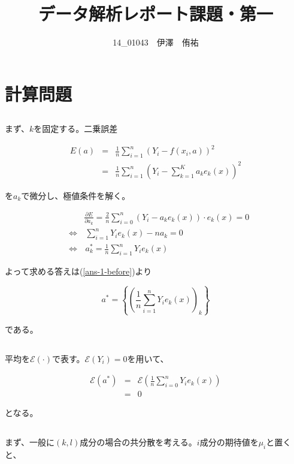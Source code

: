 \documentclass[a4paper,xelatex,ja=standard,jafont=hiragino-pron]{bxjsarticle}
\title{データ解析レポート課題・第一}
\author{14\_01043　伊澤　侑祐}
\date{}
\begin{document}
\maketitle
\section{計算問題}
\subsection{}
まず、$k$を固定する。二乗誤差

\begin{eqnarray}
  E(a) &=& \frac{1}{n} \sum_{i = 1}^n (Y_i - f(x_i, a))^2 \nonumber \\
       &=& \frac{1}{n} \sum_{i = 1}^n (Y_i - \sum_{k = 1}^K a_k e_k(x))^2
\end{eqnarray}

を$a_k$で微分し、極値条件を解く。

\begin{eqnarray}
  &&\frac{\partial E}{\partial a_k}
    = \frac{2}{n} \sum_{i = 0}^n (Y_i - a_ke_k(x)) \cdot e_k(x) = 0 \nonumber \\
    &\Longleftrightarrow& \, \sum_{i=1}^n Y_i e_k(x) - n a_k = 0 \nonumber \\
    &\Longleftrightarrow& \, a^*_k = \frac{1}{n} \sum_{i=1}^n Y_i e_k(x)
    \label{ans-1-before}
\end{eqnarray}

よって求める答えは(\ref{ans-1-before})より

\begin{equation}
  a^* = \left\{ \left(\frac{1}{n} \sum_{i=1}^n Y_i e_k(x)\right)_k \right\}
\end{equation}

である。

\subsection{}
平均を$\mathscr{E}(\cdot)$で表す。$\mathscr{E}(Y_i) = 0$を用いて、

\begin{eqnarray}
  \mathscr{E}(a^*)
    &=& \mathscr{E} \left(\frac{1}{n}\sum_{i=0}^n Y_i e_k (x) \right) \nonumber \\
    &=& 0
\end{eqnarray}

となる。
\subsection{}
まず、一般に$(k, l)$成分の場合の共分散を考える。$i$成分の期待値を$\mu_i$と置くと、
\end{document}
